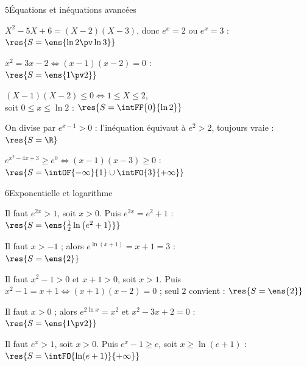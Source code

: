 \begin{deuxcolonnes}
\begin{corrige}{5}{Équations et inéquations avancées}
\begin{questions}
  \item $X^{2}-5X+6=(X-2)(X-3)$, donc $e^{x}=2$ ou $e^{x}=3$ :\\ $\res{S=\ens{\ln2\pv\ln3}}$
  \item $x^{2}=3x-2\iff(x-1)(x-2)=0$ :\\ $\res{S=\ens{1\pv2}}$
  \item $(X-1)(X-2)\leq0\iff1\leq X\leq2$,\\ soit $0\leq x\leq\ln2$ : $\res{S=\intFF{0}{\ln2}}$
  \item On divise par $e^{x-1}>0$ : l'inéquation équivaut à $e^{2}>2$, toujours vraie : $\res{S=\R}$
  \item $e^{x^{2}-4x+3}\geq e^{0}\iff(x-1)(x-3)\geq0$ :\\ $\res{S=\intOF{-\infty}{1}\cup\intFO{3}{+\infty}}$
\end{questions}
\end{corrige}

\begin{corrige}{6}{Exponentielle et logarithme}
\begin{questions}
  \item Il faut $e^{2x}>1$, soit $x>0$. Puis $e^{2x}=e^{2}+1$ :\\ $\res{S=\ens{\frac12\ln\left(e^{2}+1\right)}}$
  \item Il faut $x>-1$ ; alors $e^{\ln(x+1)}=x+1=3$ :\\ $\res{S=\ens{2}}$
  \item Il faut $x^{2}-1>0$ et $x+1>0$, soit $x>1$. Puis $x^{2}-1=x+1\iff(x+1)(x-2)=0$ ; seul $2$ convient : $\res{S=\ens{2}}$
  \item Il faut $x>0$ ; alors $e^{2\ln x}=x^{2}$ et $x^{2}-3x+2=0$ :\\ $\res{S=\ens{1\pv2}}$
  \item Il faut $e^{x}>1$, soit $x>0$. Puis $e^{x}-1\geq e$, soit $x\geq\ln(e+1)$ :\\ $\res{S=\intFO{\ln(e+1)}{+\infty}}$
\end{questions}
\end{corrige}

\end{deuxcolonnes}

